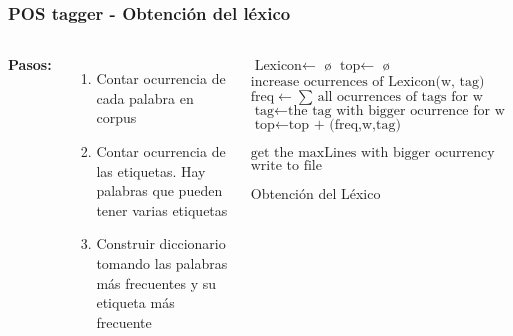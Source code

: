 \documentclass{beamer}
\begin{document}
\begin{frame}[fragile]
\frametitle{POS tagger - Obtención del léxico}
\begin{columns}[t] %
\textbf{Pasos:}
\begin{enumerate}
\item Contar ocurrencia de cada palabra en corpus
\item Contar ocurrencia de las etiquetas. Hay palabras que
pueden tener varias etiquetas
\item Construir diccionario tomando las palabras más frecuentes y su etiqueta más frecuente
\end{enumerate}
\begin{algorithm}[H]
\begin{scriptsize}
    \begin{algorithmic}[1]
    \State $\text{Lexicon} \gets$ \o
    \State $\text{top} \gets$ \o
            \State $\text{increase ocurrences of Lexicon(w, tag)} $
            \EndFor
    \EndFor        
            \State $\text{freq} \gets \text{$\sum$ all ocurrences of tags for w}$
             \State $\text{tag} \gets \text{the tag with bigger ocurrence for w}$
             \State $\text{top} \gets \text{top + (freq,w,tag) }$
            \EndFor
            
     \State $\text{get the maxLines with bigger ocurrency}$ 
     \State $\text{write to file}$      
        \EndProcedure
    \end{algorithmic}
    \label{alg:rAP}
    \caption{Obtención del Léxico}
    \end{scriptsize}
\end{algorithm}

\end{columns}
\end{frame}
\end{document}

